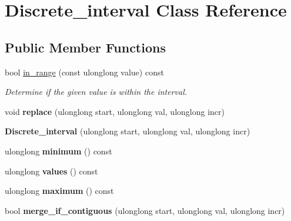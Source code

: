 \hypertarget{classDiscrete__interval}{}\section{Discrete\+\_\+interval Class Reference}
\label{classDiscrete__interval}
\subsection*{Public Member Functions}
\begin{DoxyCompactItemize}
\item 
\mbox{\label{classDiscrete__interval_a1c92adaa181a27c822201e7f1e46ce70}} 
bool \mbox{\hyperlink{classDiscrete__interval_a1c92adaa181a27c822201e7f1e46ce70}{in\+\_\+range}} (const ulonglong value) const
\begin{DoxyCompactList}\small\item\em Determine if the given value is within the interval. \end{DoxyCompactList}\item 
\mbox{\label{classDiscrete__interval_adec0b3bdffdf0bd64c59f80fd1ce34a5}} 
void {\bfseries replace} (ulonglong start, ulonglong val, ulonglong incr)
\item 
\mbox{\label{classDiscrete__interval_ae6217bedbb9726d0318c6c949505d435}} 
{\bfseries Discrete\+\_\+interval} (ulonglong start, ulonglong val, ulonglong incr)
\item 
\mbox{\label{classDiscrete__interval_ab5c24ab6e1468cc3e708c529d942b066}} 
ulonglong {\bfseries minimum} () const
\item 
\mbox{\label{classDiscrete__interval_aa8fb13dd6348d3e65bf0d92b4ef8dea1}} 
ulonglong {\bfseries values} () const
\item 
\mbox{\label{classDiscrete__interval_a47bbced7939a01d41a2bc608fd5c4221}} 
ulonglong {\bfseries maximum} () const
\item 
\mbox{\label{classDiscrete__interval_a0df410646930d91b237a9436250c1aab}} 
bool {\bfseries merge\+\_\+if\+\_\+contiguous} (ulonglong start, ulonglong val, ulonglong incr)
\end{DoxyCompactItemize}
